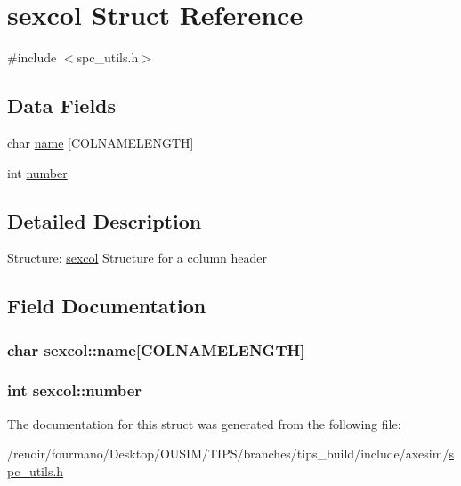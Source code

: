 \hypertarget{structsexcol}{
\section{sexcol Struct Reference}
\label{structsexcol}
}


{\ttfamily \#include $<$spc\_\-utils.h$>$}\subsection*{Data Fields}
\begin{DoxyCompactItemize}
\item 
char \hyperlink{structsexcol_a570145e70159e58db2e88d99830dda95}{name} \mbox{[}COLNAMELENGTH\mbox{]}
\item 
int \hyperlink{structsexcol_af73c810dc7f06f2585ba28425d5eb595}{number}
\end{DoxyCompactItemize}


\subsection{Detailed Description}
Structure: \hyperlink{structsexcol}{sexcol} Structure for a column header 

\subsection{Field Documentation}
\hypertarget{structsexcol_a570145e70159e58db2e88d99830dda95}{
\subsubsection[{name}]{\setlength{\rightskip}{0pt plus 5cm}char {\bf sexcol::name}\mbox{[}COLNAMELENGTH\mbox{]}}}
\label{structsexcol_a570145e70159e58db2e88d99830dda95}
\hypertarget{structsexcol_af73c810dc7f06f2585ba28425d5eb595}{
\subsubsection[{number}]{\setlength{\rightskip}{0pt plus 5cm}int {\bf sexcol::number}}}
\label{structsexcol_af73c810dc7f06f2585ba28425d5eb595}


The documentation for this struct was generated from the following file:\begin{DoxyCompactItemize}
\item 
/renoir/fourmano/Desktop/OUSIM/TIPS/branches/tips\_\-build/include/axesim/\hyperlink{spc__utils_8h}{spc\_\-utils.h}\end{DoxyCompactItemize}

